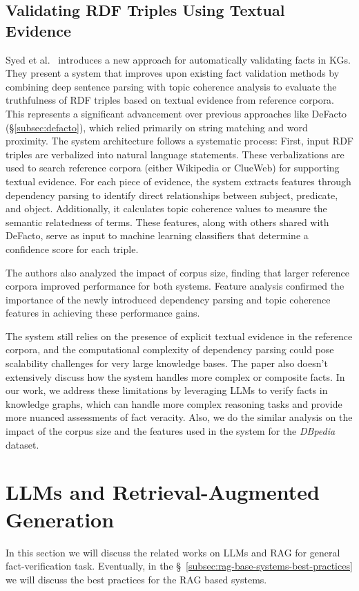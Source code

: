 \subsection{Validating RDF Triples Using Textual Evidence}\label{subsec:validating-rdf-triples-using-textual-evidence}
Syed et al.~\cite{10.1145/3269206.3269308} introduces a new approach for automatically validating facts in \acp{KG}.
They present a system that improves upon existing fact validation methods by combining deep sentence parsing with topic coherence analysis to evaluate the truthfulness of RDF triples based on textual evidence from reference corpora.
This represents a significant advancement over previous approaches like DeFacto (\S\ref{subsec:defacto}), which relied primarily on string matching and word proximity.
The system architecture follows a systematic process: First, input RDF triples are verbalized into natural language statements.
These verbalizations are used to search reference corpora (either Wikipedia or ClueWeb) for supporting textual evidence.
For each piece of evidence, the system extracts features through dependency parsing to identify direct relationships between subject, predicate, and object.
Additionally, it calculates topic coherence values to measure the semantic relatedness of terms.
These features, along with others shared with DeFacto, serve as input to machine learning classifiers that determine a confidence score for each triple.

The authors also analyzed the impact of corpus size, finding that larger reference corpora improved performance for both systems.
Feature analysis confirmed the importance of the newly introduced dependency parsing and topic coherence features in achieving these performance gains.

The system still relies on the presence of explicit textual evidence in the reference corpora, and the computational complexity of dependency parsing could pose scalability challenges for very large knowledge bases.
The paper also doesn't extensively discuss how the system handles more complex or composite facts.
In our work, we address these limitations by leveraging \ac{LLMs} to verify facts in knowledge graphs, which can handle more complex reasoning tasks and provide more nuanced assessments of fact veracity.
Also, we do the similar analysis on the impact of the corpus size and the features used in the system for the \textit{DBpedia} dataset.


\section{LLMs and Retrieval-Augmented Generation}\label{sec:llms-and-retrieval-augmented-generation}
In this section we will discuss the related works on \ac{LLMs} and \ac{RAG} for general fact-verification task.
Eventually, in the \S~\ref{subsec:rag-base-systems-best-practices} we will discuss the best practices for the \ac{RAG} based systems.

